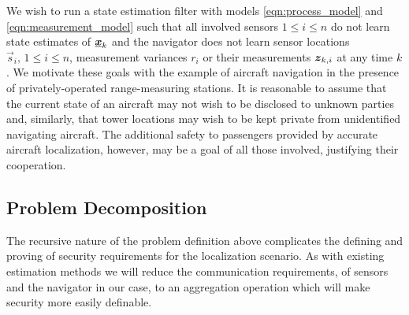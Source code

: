 \documentclass[10pt,letterpaper,oneside,twocolumn,journal]{IEEEtran}
\theoremstyle{definition}
\theoremstyle{definition}
\theoremstyle{remark}
\begin{document}
We wish to run a state estimation filter with models \eqref{eqn:process_model} and \eqref{eqn:measurement_model} such that all involved sensors $1 \leq i \leq n$ do not learn state estimates of ${\boldsymbol{\underline{x}}}_{k}$ and the navigator does not learn sensor locations $\vec{s}_i,\,1 \leq i \leq n$, measurement variances $r_i$ or their measurements ${\boldsymbol{z}}_{k,i}$ at any time $k$. We motivate these goals with the example of aircraft navigation in the presence of privately-operated range-measuring stations. It is reasonable to assume that the current state of an aircraft may not wish to be disclosed to unknown parties and, similarly, that tower locations may wish to be kept private from unidentified navigating aircraft. The additional safety to passengers provided by accurate aircraft localization, however, may be a goal of all those involved, justifying their cooperation.

% 
% 

\subsection{Problem Decomposition} \label{subsec:problem_decomposition}
The recursive nature of the problem definition above complicates the defining and proving of security requirements for the localization scenario. As with existing estimation methods \cite{benhamoudaNewFrameworkPrivacyPreserving2016,alexandruEncryptedCooperativeControl2019} we will reduce the communication requirements, of sensors and the navigator in our case, to an aggregation operation which will make security more easily definable. 
\end{document}
